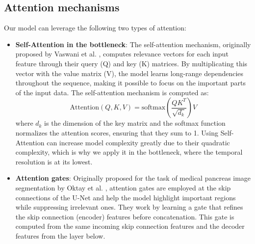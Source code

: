 \newpage
\subsection*{Attention mechanisms}

Our model can leverage the following two types of attention:

\begin{itemize}
    \item \textbf{Self-Attention in the bottleneck}: The self-attention mechanism, originally proposed by Vaswani et al. \cite{vaswani2017attention}, computes relevance vectors for each input feature through their query (Q) and key (K) matrices. By multiplicating this vector with the value matrix (V), the model learns long-range dependencies throughout the sequence, making it possible to focus on the important parts of the input data. The self-attention mechanism is computed as:
    \begin{equation}
        \text{Attention}(Q, K, V) = \text{softmax}\left(\frac{QK^T}{\sqrt{d_k}}\right)V
    \end{equation}
    where $d_k$ is the dimension of the key matrix and the softmax function normalizes the attention scores, ensuring that they sum to 1.
    Using Self-Attention can increase model complexity greatly due to their quadratic complexity, which is why we apply it in the bottleneck, where the temporal resolution is at its lowest.
    \item \textbf{Attention gates}: Originally proposed for the task of medical pancreas image segmentation by Oktay et al. \cite{oktay2018attention}, attention gates are employed at the skip connections of the U-Net and help the model highlight important regions while suppressing irrelevant ones. They work by learning a gate that refines the skip connection (encoder) features before concatenation. This gate is computed from the same incoming skip connection features and the decoder features from the layer below.
\end{itemize}

